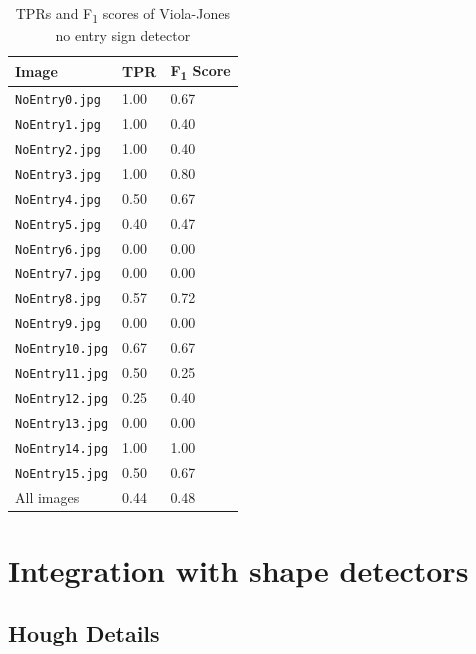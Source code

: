 \documentclass[twocolumn, 10pt, a4paper]{article}
\begin{document}
\begin{table}[htbp]
  \begin{center}
  \caption{TPRs and F\textsubscript{1} scores of Viola-Jones no entry sign detector}\label{tab:vj}
  \begin{tabular}{l | l l} 
    \hline\hline
    Image&TPR&F\textsubscript{1} Score\\
    \hline
    \texttt{NoEntry0.jpg}&1.00&0.67\\ 
    \texttt{NoEntry1.jpg}&1.00&0.40\\ 
    \texttt{NoEntry2.jpg}&1.00&0.40\\ 
    \texttt{NoEntry3.jpg}&1.00&0.80\\ 
    \texttt{NoEntry4.jpg}&0.50&0.67\\ 
    \texttt{NoEntry5.jpg}&0.40&0.47\\ 
    \texttt{NoEntry6.jpg}&0.00&0.00\\ 
    \texttt{NoEntry7.jpg}&0.00&0.00\\
    \texttt{NoEntry8.jpg}&0.57&0.72\\ 
    \texttt{NoEntry9.jpg}&0.00&0.00\\ 
    \texttt{NoEntry10.jpg}&0.67&0.67\\ 
    \texttt{NoEntry11.jpg}&0.50&0.25\\ 
    \texttt{NoEntry12.jpg}&0.25&0.40\\ 
    \texttt{NoEntry13.jpg}&0.00&0.00\\ 
    \texttt{NoEntry14.jpg}&1.00&1.00\\ 
    \texttt{NoEntry15.jpg}&0.50&0.67\\ 
    \hdashline
    All images&0.44&0.48\\ 
    \hline
  \end{tabular}
  \end{center}
\end{table} 

\clearpage

\section{Integration with shape detectors}

\subsection{Hough Details}
\end{document}
